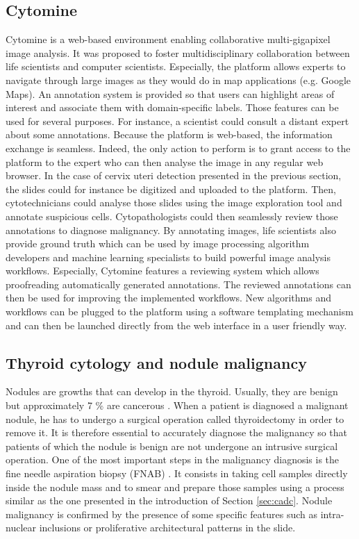 \subsection{Cytomine} 
\label{sssec:detect_cytomine}
Cytomine \cite{maree2016collaborative} is a web-based environment enabling collaborative multi-gigapixel image analysis. It was proposed to foster multidisciplinary collaboration between life scientists and computer scientists. Especially, the platform allows experts to navigate through large images as they would do in map applications (e.g. Google Maps). An annotation system is provided so that users can highlight areas of interest and associate them with domain-specific labels. Those features can be used for several purposes. For instance, a scientist could consult a distant expert about some annotations. Because the platform is web-based, the information exchange is seamless. Indeed, the only action to perform is to grant access to the platform to the expert who can then analyse the image in any regular web browser. In the case of cervix uteri detection presented in the previous section, the slides could for instance be digitized and uploaded to the platform. Then, cytotechnicians could analyse those slides using the image exploration tool and annotate suspicious cells. Cytopathologists could then seamlessly review those annotations to diagnose malignancy. By annotating images, life scientists also provide ground truth which can be used by image processing algorithm developers and machine learning specialists to build powerful image analysis workflows. Especially, Cytomine features a reviewing system which allows proofreading automatically generated annotations. The reviewed annotations can then be used for improving the implemented workflows. New algorithms and workflows can be plugged to the platform using a software templating mechanism and can then be launched directly from the web interface in a user friendly way.  

\subsection{Thyroid cytology and nodule malignancy}
\label{ssec:intro_thyroid_case}
Nodules are growths that can develop in the thyroid. Usually, they are benign but approximately 7 \% are cancerous \cite{gopinath2013computer}. When a patient is diagnosed a malignant nodule, he has to undergo a surgical operation called thyroidectomy in order to remove it. It is therefore essential to accurately diagnose the malignancy so that patients of which the nodule is benign are not undergone an intrusive surgical operation. One of the most important steps in the malignancy diagnosis is the fine needle aspiration biopsy (FNAB) \cite{bomeli2010evaluation}. It consists in taking cell samples directly inside the nodule mass and to smear and prepare those samples using a process similar as the one presented in the introduction of Section \ref{sec:cadc}. Nodule malignancy is confirmed by the presence of some specific features such as intra-nuclear inclusions or proliferative architectural patterns in the slide. 

